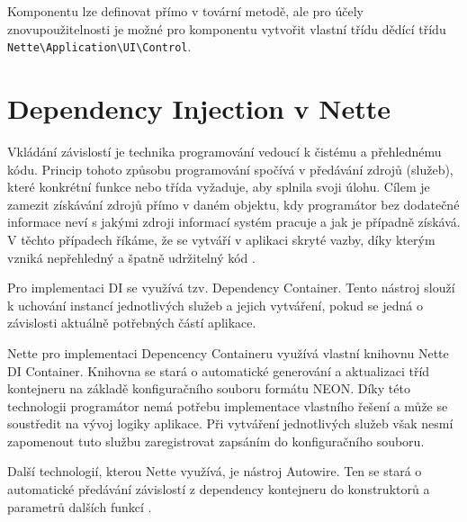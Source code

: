 \documentclass[czech,BP]{thesiskiv}
\begin{document}
		\par Komponentu lze definovat přímo v tovární metodě, ale pro účely znovupoužitelnosti je možné pro komponentu vytvořit vlastní třídu dědící třídu \texttt{Nette\textbackslash Application\textbackslash UI\textbackslash Control}.
		
		\section{Dependency Injection v Nette}
		\par Vkládání závislostí je technika programování vedoucí k čistému a přehlednému kódu. Princip tohoto způsobu programování spočívá v předávání zdrojů (služeb), které konkrétní funkce nebo třída vyžaduje, aby splnila svoji úlohu. Cílem je zamezit získávání zdrojů přímo v daném objektu, kdy programátor bez dodatečné informace neví s jakými zdroji informací systém pracuje a jak je případně získává. V těchto případech říkáme, že se vytváří v aplikaci skryté vazby, díky kterým vzniká nepřehledný a špatně udržitelný kód \cite{PHP-DI}.
		\par Pro implementaci DI se využívá tzv. Dependency Container. Tento nástroj slouží k uchování instancí jednotlivých služeb a jejich vytváření, pokud se jedná o závislosti aktuálně potřebných částí aplikace.
		\par Nette pro implementaci Depencency Containeru využívá vlastní knihovnu Nette DI Container. Knihovna se stará o automatické generování a aktualizaci tříd kontejneru na základě konfiguračního souboru formátu NEON. Díky této technologii programátor nemá potřebu implementace vlastního řešení a může se soustředit na vývoj logiky aplikace. Při vytváření jednotlivých služeb však nesmí zapomenout tuto službu zaregistrovat zapsáním do konfiguračního souboru.
		\par Další technologií, kterou Nette využívá, je nástroj Autowire. Ten se stará o automatické předávání závislostí z dependency kontejneru do konstruktorů a parametrů dalších funkcí \cite{NetteDI}.
		
\end{document}
